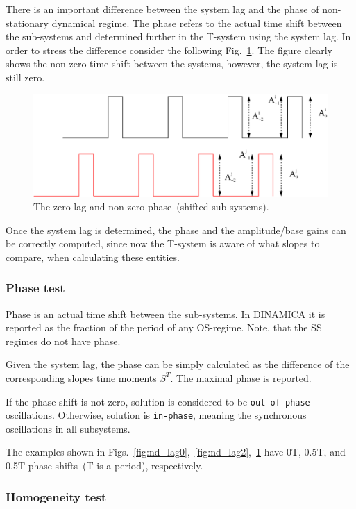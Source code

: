 \documentclass[11pt,a4paper]{article}
\begin{document}
There is an important difference between the system lag and the phase of
non-stationary dynamical regime. The phase refers to the actual time shift between
the sub-systems and determined further in the T-system using the system lag. In order
to stress the difference consider the following Fig.~\ref{fig:nd_lag0_shifted}. The
figure clearly shows the non-zero time shift between the systems, however, the system
lag is still zero.

\begin{figure}[h]
  \centering
  \includegraphics[scale=0.45]{nd_lag0_shifted}
  \caption{The zero lag and non-zero phase~(shifted sub-systems).}
  \label{fig:nd_lag0_shifted}
\end{figure}

Once the system lag is determined, the phase and the amplitude/base gains can be
correctly computed, since now the T-system is aware of what slopes to compare, when
calculating these entities.

\subsubsection{Phase test}
\label{sec:phase}

Phase is an actual time shift between the sub-systems. In DINAMICA it is reported as
the fraction of the period of any OS-regime. Note, that the SS regimes do not have
phase.

Given the system lag, the phase can be simply calculated as the difference of the
corresponding slopes time moments $S^{T}$. The maximal phase is reported.

If the phase shift is not zero, solution is considered to be \texttt{out-of-phase}
oscillations. Otherwise, solution is \texttt{in-phase}, meaning the synchronous
oscillations in all subsystems.

The examples shown in
Figs.~\ref{fig:nd_lag0},~\ref{fig:nd_lag2},~\ref{fig:nd_lag0_shifted} have 0T, 0.5T, and
0.5T phase shifts~(T is a period), respectively.

\subsubsection{Homogeneity test}
\label{sec:homogeneity-test}
\end{document}
